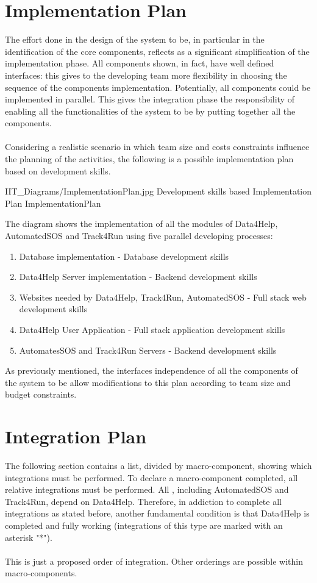 \documentclass[../DD.tex]{subfiles}
\begin{document}
\section{Implementation Plan}
The effort done in the design of the system to be, in particular in the identification of the core components, reflects as a significant simplification of the implementation phase. All components shown, in fact, have well defined interfaces: this gives to the developing team more flexibility in choosing the sequence of the components implementation. Potentially, all components could be implemented in parallel. This gives the integration phase the responsibility of enabling all the functionalities of the system to be by putting together all the components. \\\\
Considering a realistic scenario in which team size and costs constraints influence the planning of the activities, the following is a possible implementation plan based on development skills.

\image {13cm} {IIT_Diagrams/ImplementationPlan.jpg} {Development skills based Implementation Plan} {ImplementationPlan}

The diagram shows the implementation of all the modules of Data4Help, AutomatedSOS and Track4Run using five parallel developing processes:
\begin{enumerate}
	\item Database implementation - Database development skills
	\item Data4Help Server implementation - Backend development skills
	\item Websites needed by Data4Help, Track4Run, AutomatedSOS - Full stack web development skills
	\item Data4Help User Application - Full stack application development skills
	\item AutomatesSOS and Track4Run Servers - Backend development skills
\end{enumerate}
As previously mentioned, the interfaces independence of all the components of the system to be allow modifications to this plan according to team size and budget constraints.

\section{Integration Plan\label{sect:5.4}}
The following section contains a list, divided by macro-component, showing which integrations must be performed. To declare a macro-component completed, all relative integrations must be performed. All , including AutomatedSOS and Track4Run, depend on Data4Help. Therefore, in addiction to complete all integrations as stated before, another fundamental condition is that Data4Help is completed and fully working (integrations of this type are marked with an asterisk "*").\\\\
This is just a proposed order of integration. Other orderings are possible within macro-components. 
\end{document}
